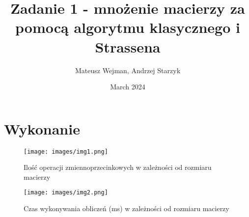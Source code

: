\documentclass{article}
\title{Zadanie 1 - mnożenie macierzy za pomocą algorytmu klasycznego i Strassena}
\author{Mateusz Wejman, Andrzej Starzyk}
\date{March 2024}
\begin{document}
\maketitle

\section{Wykonanie}







\begin{figure}
    \centering
    \hspace*{-3cm}%
    \texttt{[image: images/img1.png]}
    \caption{Ilość operacji zmiennoprzecinkowych w zależności od rozmiaru macierzy}
    \label{fig:my_label}
\end{figure}


\begin{figure}
    \centering
    \hspace*{-3cm}%
    \texttt{[image: images/img2.png]}
    \caption{Czas wykonywania obliczeń (ms) w zależności od rozmiaru macierzy}
    \label{fig:my_label}
\end{figure}
\end{document}
